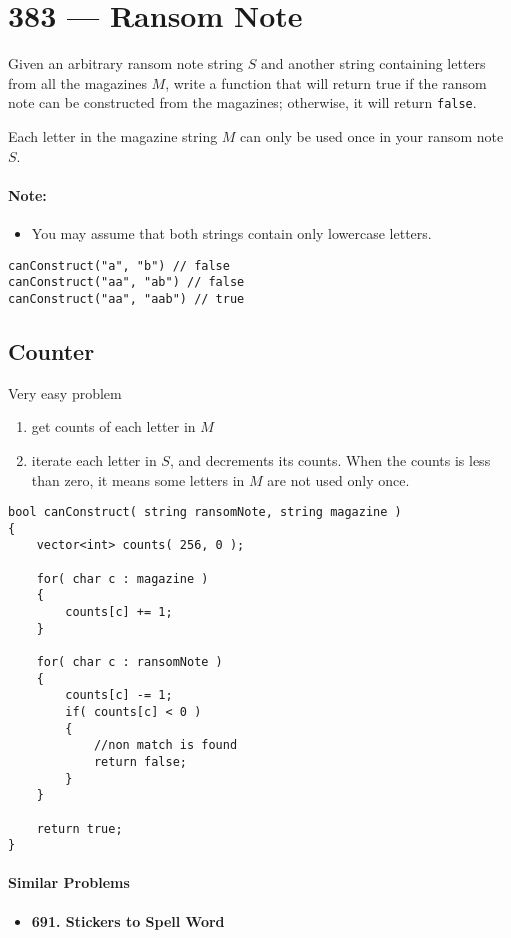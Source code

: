 \section{383 --- Ransom Note}
Given an arbitrary ransom note string $S$ and another string containing letters from all the magazines $M$, write a function that will return true if the ransom note can be constructed from the magazines; otherwise, it will return \texttt{false}.
\par
Each letter in the magazine string $M$ can only be used once in your ransom note $S$.

\paragraph{Note:}
\begin{itemize}
\item You may assume that both strings contain only lowercase letters.
\end{itemize}

\begin{lstlisting}[style=customc]
canConstruct("a", "b") // false
canConstruct("aa", "ab") // false
canConstruct("aa", "aab") // true
\end{lstlisting}

\subsection{Counter}
Very easy problem
\begin{enumerate}
\item get counts of each letter in $M$
\item iterate each letter in $S$, and decrements its counts. When the counts is less than zero, it means some letters in $M$ are not used only once.
\end{enumerate}

\setcounter{lstlisting}{0}
\begin{lstlisting}[style=customc, caption={Counter}]
bool canConstruct( string ransomNote, string magazine )
{
    vector<int> counts( 256, 0 );

    for( char c : magazine )
    {
        counts[c] += 1;
    }

    for( char c : ransomNote )
    {
        counts[c] -= 1;
        if( counts[c] < 0 )
        {
            //non match is found
            return false;
        }
    }

    return true;
}
\end{lstlisting}

\paragraph{Similar Problems}
\begin{itemize}
\item \textbf{691. Stickers to Spell Word}
\end{itemize}
